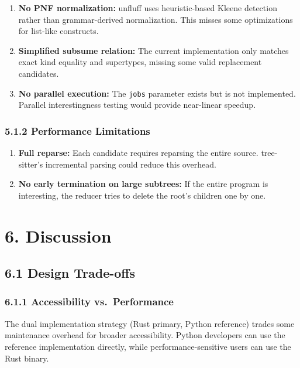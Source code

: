 \documentclass[
  letterpaper,
]{article}
\begin{document}
\begin{enumerate}
\def\labelenumi{\arabic{enumi}.}
\item
  \textbf{No PNF normalization:} unfluff uses heuristic-based Kleene
  detection rather than grammar-derived normalization. This misses some
  optimizations for list-like constructs.
\item
  \textbf{Simplified subsume relation:} The current implementation only
  matches exact kind equality and supertypes, missing some valid
  replacement candidates.
\item
  \textbf{No parallel execution:} The \texttt{jobs} parameter exists but
  is not implemented. Parallel interestingness testing would provide
  near-linear speedup.
\end{enumerate}

\subsubsection{5.1.2 Performance
Limitations}\label{performance-limitations}

\begin{enumerate}
\def\labelenumi{\arabic{enumi}.}
\item
  \textbf{Full reparse:} Each candidate requires reparsing the entire
  source. tree-sitter's incremental parsing could reduce this overhead.
\item
  \textbf{No early termination on large subtrees:} If the entire program
  is interesting, the reducer tries to delete the root's children one by
  one.
\end{enumerate}

\section{6. Discussion}\label{discussion}

\subsection{6.1 Design Trade-offs}\label{design-trade-offs}

\subsubsection{6.1.1 Accessibility
vs.~Performance}\label{accessibility-vs.-performance}

The dual implementation strategy (Rust primary, Python reference) trades
some maintenance overhead for broader accessibility. Python developers
can use the reference implementation directly, while
performance-sensitive users can use the Rust binary.
\end{document}
